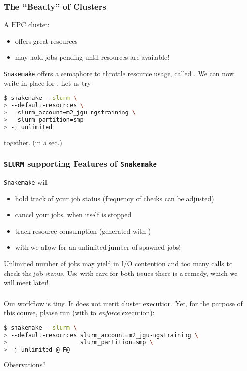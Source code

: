 \begin{frame}[fragile]
  \frametitle{The ``Beauty'' of Clusters}
  A HPC cluster:
  \begin{itemize}
   \item offers great resources
   \item may hold jobs pending until resources are available!
  \end{itemize}
  \pause
  \texttt{Snakemake} offers a semaphore to throttle resource usage, called . We can now write  in place for . Let us try
  \begin{lstlisting}[language=Bash, style=Shell, basicstyle=\footnotesize]
$ snakemake --slurm \
> --default-resources \ 
>   slurm_account=m2_jgu-ngstraining \
>   slurm_partition=smp
> -j unlimited
  \end{lstlisting}
  together. (in a sec.)
\end{frame}

\begin{frame}[fragile]
  \frametitle{\texttt{SLURM} supporting Features of \texttt{Snakemake}}
  \texttt{Snakemake} will
  \begin{itemize}[<+->]
   \item hold track of your job status (frequency of checks can be adjusted)
   \item cancel your jobs, when itself is stopped
   \item track resource consumption (generated with )
   \item with \altverb{-j unlimited} we allow for an unlimited jumber of spawned jobs!
  \end{itemize}
  \pause
  \begin{warning}
  	Unlimited number of jobs may yield in I/O contention and too many calls to check the job status. Use with care for both issues there is a remedy, which we will meet later!
  \end{warning}
\end{frame}

\begin{frame}[fragile]
  \frametitle{}
  Our workflow is {\tiny tiny}. It does not merit cluster execution. Yet, for the purpose of this course, please run (with  to \emph{enforce} execution):
  \begin{lstlisting}[language=Bash, style=Shell, basicstyle=\footnotesize]
$ snakemake --slurm \
> --default-resources slurm_account=m2_jgu-ngstraining \
>                     slurm_partition=smp \
> -j unlimited @-F@
  \end{lstlisting}
  \begin{question}
  	Observations?
  \end{question}
\end{frame}

